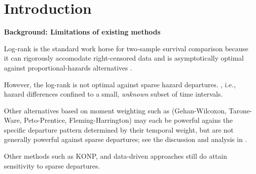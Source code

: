 \documentclass[unnumsec,webpdf,contemporary,large]{oup-authoring-template}
\let\origitemize\itemize
\let\origenditemize\enditemize
\renewenvironment{itemize}{%
  \origitemize
  \setlength{\itemsep}{1pt}%
  \setlength{\parskip}{0pt}%
  \setlength{\topsep}{3pt}%
}{\origenditemize}
\begin{document}
\maketitle


\section{Introduction}

\textbf{Background: Limitations of existing methods}
\begin{itemize}
  \item Log-rank \citep{mantel1966} is the standard work horse for two-sample survival comparison because it can rigorously accomodate right-censored data and is asymptotically optimal against proportional-hazards alternatives \citep{schoenfeld1981}.
  \item However, the log-rank is not optimal against sparse hazard departures. \citep{kipnis_biometrika}, i.e.,  hazard differences
        confined to a small, \emph{unknown} subset of time intervals. 
 \item Other alternatives based on moment weighting such as (Gehan-Wilcoxon, Tarone-Ware,
        Peto-Prentice, Fleming-Harrington) may each be powerful agains the specific departure pattern determined by their temporal weight, but are not generally powerful against sparse departures; see the discussion and analysis in \citep{kipnis_biometrika}.  
      \item Other methods such as KONP, and data-driven approaches still do attain sensitivity to sparse departures. 
\end{itemize}
\end{document}
